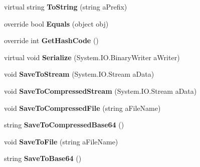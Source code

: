 \begin{DoxyCompactItemize}
\item 
\hypertarget{class_simple_j_s_o_n_1_1_j_object_a308b1df9599ff7a6e4503b129fbe69a2}{virtual string {\bfseries To\+String} (string a\+Prefix)}\label{class_simple_j_s_o_n_1_1_j_object_a308b1df9599ff7a6e4503b129fbe69a2}

\item 
\hypertarget{class_simple_j_s_o_n_1_1_j_object_a36878fefdcf1dc6d9a21c8c6f0a0db46}{override bool {\bfseries Equals} (object obj)}\label{class_simple_j_s_o_n_1_1_j_object_a36878fefdcf1dc6d9a21c8c6f0a0db46}

\item 
\hypertarget{class_simple_j_s_o_n_1_1_j_object_abd81492c09870a69c01371ca0e005196}{override int {\bfseries Get\+Hash\+Code} ()}\label{class_simple_j_s_o_n_1_1_j_object_abd81492c09870a69c01371ca0e005196}

\item 
\hypertarget{class_simple_j_s_o_n_1_1_j_object_a6fdc426f3d3f3fc1f134cd32697dbe56}{virtual void {\bfseries Serialize} (System.\+I\+O.\+Binary\+Writer a\+Writer)}\label{class_simple_j_s_o_n_1_1_j_object_a6fdc426f3d3f3fc1f134cd32697dbe56}

\item 
\hypertarget{class_simple_j_s_o_n_1_1_j_object_aae9fa8f777a57aed2c135f65c2a25701}{void {\bfseries Save\+To\+Stream} (System.\+I\+O.\+Stream a\+Data)}\label{class_simple_j_s_o_n_1_1_j_object_aae9fa8f777a57aed2c135f65c2a25701}

\item 
\hypertarget{class_simple_j_s_o_n_1_1_j_object_a8dd8510185ce27bb513b55df6e30f14b}{void {\bfseries Save\+To\+Compressed\+Stream} (System.\+I\+O.\+Stream a\+Data)}\label{class_simple_j_s_o_n_1_1_j_object_a8dd8510185ce27bb513b55df6e30f14b}

\item 
\hypertarget{class_simple_j_s_o_n_1_1_j_object_aaad56108aeaa1fcdc2ac7f269c45d596}{void {\bfseries Save\+To\+Compressed\+File} (string a\+File\+Name)}\label{class_simple_j_s_o_n_1_1_j_object_aaad56108aeaa1fcdc2ac7f269c45d596}

\item 
\hypertarget{class_simple_j_s_o_n_1_1_j_object_aa2f54f92e29ec8ee7a162aea66e59f83}{string {\bfseries Save\+To\+Compressed\+Base64} ()}\label{class_simple_j_s_o_n_1_1_j_object_aa2f54f92e29ec8ee7a162aea66e59f83}

\item 
\hypertarget{class_simple_j_s_o_n_1_1_j_object_ac74fea8e3c6b744181e7188dc09f7b61}{void {\bfseries Save\+To\+File} (string a\+File\+Name)}\label{class_simple_j_s_o_n_1_1_j_object_ac74fea8e3c6b744181e7188dc09f7b61}

\item 
\hypertarget{class_simple_j_s_o_n_1_1_j_object_a510428f558b12d0f60e5c930efa93727}{string {\bfseries Save\+To\+Base64} ()}\label{class_simple_j_s_o_n_1_1_j_object_a510428f558b12d0f60e5c930efa93727}

\end{DoxyCompactItemize}

